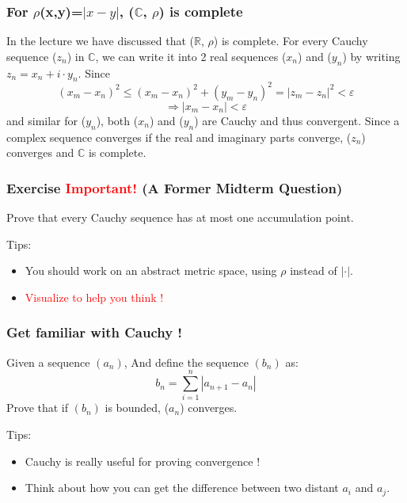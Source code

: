 \documentclass{beamer}
\begin{document}
\begin{frame}
    \frametitle{For $\rho$(x,y)=$\left|x-y\right|$, ($\mathbb{C}$, $\rho$) is complete}
    In the lecture we have discussed that ($\mathbb{R}$, $\rho$) is complete.
    For every Cauchy sequence ($z_n$) in $\mathbb{C}$,
    we can write it into 2 real sequences ($x_n$) and ($y_n$)
    by writing $z_n = x_n + i \cdot  y_n$. Since
    $$(x_m-x_n)^2\leq (x_m-x_n)^2+(y_m-y_n)^2=|z_m-z_n|^2<\varepsilon$$
    $$\Rightarrow |x_m-x_n|< \varepsilon$$
    and similar for ($y_n$), both ($x_n$) and ($y_n$) are Cauchy and thus convergent.
    Since a complex sequence converges if the real and imaginary parts
    converge, ($z_n$) converges and $\mathbb{C}$ is complete.

\end{frame}



\begin{frame}
    \frametitle{Exercise \textcolor{red}{Important!} (A Former Midterm Question)}
    Prove that every Cauchy sequence has at most one accumulation point.

    \vspace{2em}
    Tips:
    \begin{itemize}
        \item You should work on an abstract metric space, using $\rho $ instead of $| \cdot |$.
        \item \textcolor{red}{Visualize to help you think !}
    \end{itemize}
\end{frame}

\begin{frame}
    \frametitle{Get familiar with Cauchy !}
    Given a sequence $(a_{n})$, And define the sequence $(b_{n})$ as:
    \begin{equation*}
        b_{n} = \sum_{i=1}^{n}\left|a_{n+1}-a_{n}\right|
    \end{equation*}
    Prove that if $(b_{n})$ is bounded, ($a_{n}$) converges.

    Tips:
    \begin{itemize}
        \item Cauchy is really useful for proving convergence !
        \item Think about how you can get the difference between two distant $a_{i}$ and $a_{j}$.
    \end{itemize}
\end{frame}
\end{document}
